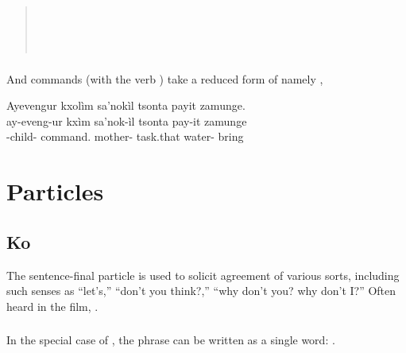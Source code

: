 \begin{quotation}
\noindent{}\\
\indent{} \\
\noindent{} \\
\indent{}
\end{quotation}

\subsubsection{} And commands (with the verb  ) take a reduced form of   namely ,

\begin{interlin}
\glll Ayevengur kxolìm sa'nokìl tsonta payit zamunge. \\
    ay-eveng-ur kxìm sa'nok-ìl tsonta pay-it zamunge \\
  -child- command. mother- task.that water- bring \\
 \Ipawl{}
\end{interlin}

\noindent{}

\section{Particles}

\subsection{Ko} The sentence-final particle  is used to solicit
agreement of various sorts, including such senses as ``let's,''
``don't you think?,'' ``why don't you? why don't I?''  Often heard in
the film,  .
\label{syn:particle:ko}

\subsubsection{} In the special case of  , 
the phrase can be written as a single word: .

